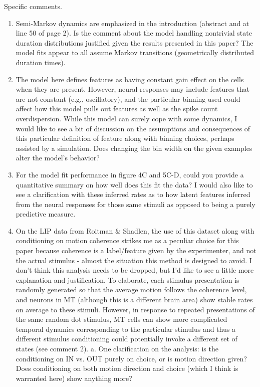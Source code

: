 \documentclass[12pt,a4paper]{article}
\begin{document}
Specific comments.
\begin{enumerate}
\item Semi-Markov dynamics are emphasized in the introduction (abstract and at line 50 of page 2). Is the comment about the model handling nontrivial state duration distributions justified given the results presented in this paper? The model fits appear to all assume Markov transitions (geometrically distributed duration times).

\item The model here defines features as having constant gain effect on the cells when they are present. However, neural responses may include features that are not constant (e.g., oscillatory), and the particular binning used could affect how this model pulls out features as well as the spike count overdispersion. While this model can surely cope with some dynamics, I would like to see a bit of discussion on the assumptions and consequences of this particular definition of feature along with binning choices, perhaps assisted by a simulation. Does changing the bin width on the given examples alter the model’s behavior?

\item For the model fit performance in figure 4C and 5C-D, could you provide a quantitative summary on how well does this fit the data? I would also like to see a clarification with these inferred rates as to how latent features inferred from the neural responses for those same stimuli as opposed to being a purely predictive measure.

\item On the LIP data from Roitman \& Shadlen, the use of this dataset along with conditioning on motion coherence strikes me as a peculiar choice for this paper because coherence is a label/feature given by the experimenter, and not the actual stimulus - almost the situation this method is designed to avoid. I don’t think this analysis needs to be dropped, but I’d like to see a little more explanation and justification. To elaborate, each stimulus presentation is randomly generated so that the average motion follows the coherence level, and neurons in MT (although this is a different brain area) show stable rates on average to these stimuli. However, in response to repeated presentations of the same random dot stimulus, MT cells can show more complicated temporal dynamics corresponding to the particular stimulus and thus a different stimulus conditioning could potentially invoke a different set of states (see comment 2).
a. One clarification on the analysis: is the conditioning on IN vs. OUT purely on choice, or is motion direction given? Does conditioning on both motion direction and choice (which I think is warranted here) show anything more?
\end{enumerate}
\end{document}
